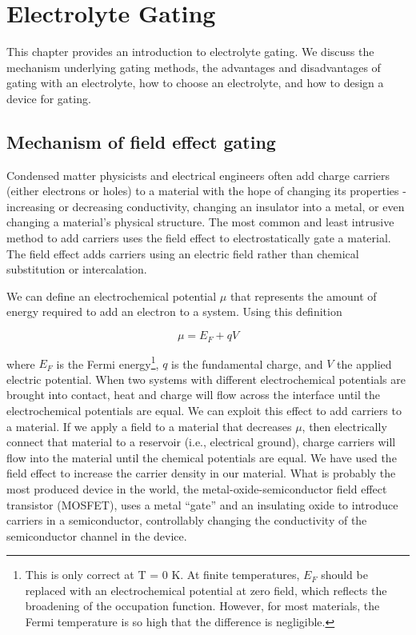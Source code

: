 \chapter{Electrolyte Gating}

This chapter provides an introduction to electrolyte gating. We discuss the mechanism underlying gating methods, the advantages and disadvantages of gating with an electrolyte, how to choose an electrolyte, and how to design a device for gating.

\section{Mechanism of field effect gating}

Condensed matter physicists and electrical engineers often add charge carriers (either electrons or holes) to a material with the hope of changing its properties - increasing or decreasing conductivity, changing an insulator into a metal, or even changing a material's physical structure. The most common and least intrusive method to add carriers uses the field effect to electrostatically gate a material. The field effect adds carriers using an electric field rather than chemical substitution or intercalation. 

We can define an electrochemical potential $\mu$ that represents the amount of energy required to add an electron to a system. Using this definition

\begin{equation}
\mu = E_{F} + qV
\end{equation}

where $E_{F}$ is the Fermi energy\footnote{This is only correct at T = 0 K. At finite temperatures, $E_{F}$ should be replaced with an electrochemical potential at zero field, which reflects the broadening of the occupation function. However, for most materials, the Fermi temperature is so high that the difference is negligible.}, $q$ is the fundamental charge, and $V$ the applied electric potential. When two systems with different electrochemical potentials are brought into contact, heat and charge will flow across the interface until the electrochemical potentials are equal. We can exploit this effect to add carriers to a material. If we apply a field to a material that decreases $\mu$, then electrically connect that material to a reservoir (i.e., electrical ground), charge carriers will flow into the material until the chemical potentials are equal. We have used the field effect to increase the carrier density in our material. What is probably the most produced device in the world, the metal-oxide-semiconductor field effect transistor (MOSFET), uses a metal ``gate'' and an insulating oxide to introduce carriers in a semiconductor, controllably changing the conductivity of the semiconductor channel in the device.


